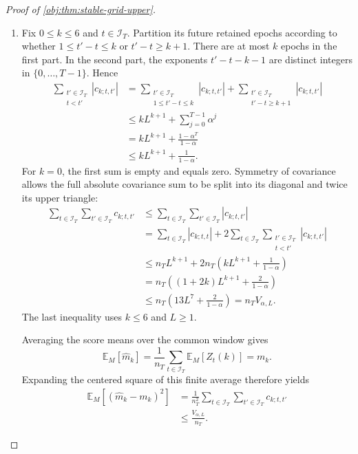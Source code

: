 \documentclass[11pt]{article}
\begin{document}
\begin{proof}[Proof of \cref{obj:thm:stable-grid-upper}]
\begin{enumerate}
\item Fix \(0\le k\le6\) and \(t\in\mathcal I_T\). Partition its future retained epochs according to whether \(1\le t'-t\le k\) or \(t'-t\ge k+1\). There are at most \(k\) epochs in the first part. In the second part, the exponents \(t'-t-k-1\) are distinct integers in \(\{0,\ldots,T-1\}\). Hence
\[
\begin{aligned}
\sum_{\substack{t'\in\mathcal I_T\\t<t'}}
 |c_{k;t,t'}|
&=
\sum_{\substack{t'\in\mathcal I_T\\1\le t'-t\le k}}
 |c_{k;t,t'}|
+
\sum_{\substack{t'\in\mathcal I_T\\t'-t\ge k+1}}
 |c_{k;t,t'}|\\
&\le
kL^{k+1}+\sum_{j=0}^{T-1}\alpha^j\\
&=
kL^{k+1}+\frac{1-\alpha^T}{1-\alpha}\\
&\le
kL^{k+1}+\frac1{1-\alpha}.
\end{aligned}
\]
For \(k=0\), the first sum is empty and equals zero. Symmetry of covariance allows the full absolute covariance sum to be split into its diagonal and twice its upper triangle:
\[
\begin{aligned}
\sum_{t\in\mathcal I_T}\sum_{t'\in\mathcal I_T}c_{k;t,t'}
&\le
\sum_{t\in\mathcal I_T}\sum_{t'\in\mathcal I_T}|c_{k;t,t'}|\\
&=
\sum_{t\in\mathcal I_T}|c_{k;t,t}|
+
2\sum_{t\in\mathcal I_T}
 \sum_{\substack{t'\in\mathcal I_T\\t<t'}}
 |c_{k;t,t'}|\\
&\le
n_TL^{k+1}
+
2n_T\left(kL^{k+1}+\frac1{1-\alpha}\right)\\
&=
n_T\left((1+2k)L^{k+1}+\frac2{1-\alpha}\right)\\
&\le
n_T\left(13L^7+\frac2{1-\alpha}\right)
=
n_TV_{\alpha,L}.
\end{aligned}
\]
The last inequality uses \(k\le6\) and \(L\ge1\).

Averaging the score means over the common window gives
\[
\mathbb E_M[\widehat m_k]
=
\frac1{n_T}\sum_{t\in\mathcal I_T}\mathbb E_M[Z_t(k)]
=
m_k.
\]
Expanding the centered square of this finite average therefore yields
\[
\begin{aligned}
\mathbb E_M[(\widehat m_k-m_k)^2]
&=
\frac1{n_T^2}
\sum_{t\in\mathcal I_T}\sum_{t'\in\mathcal I_T}c_{k;t,t'}\\
&\le
\frac{V_{\alpha,L}}{n_T}.
\end{aligned}
\]


\end{enumerate}
\end{proof}
\end{document}
